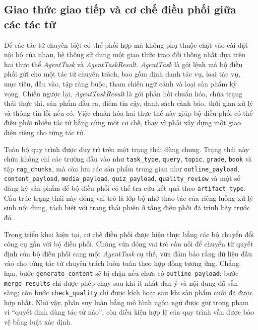 \documentclass[../DoAn.tex]{subfiles}
\begin{document}
\subsection{Giao thức giao tiếp và cơ chế điều phối giữa các tác tử}

Để các tác tử chuyên biệt có thể phối hợp mà không phụ thuộc chặt vào cài đặt nội bộ của nhau, hệ thống sử dụng một giao thức trao đổi thống nhất dựa trên hai thực thể \textit{AgentTask} và \textit{AgentTaskResult}. \textit{AgentTask} là gói lệnh mà bộ điều phối gửi cho một tác tử chuyên trách, bao gồm định danh tác vụ, loại tác vụ, mục tiêu, đầu vào, tập ràng buộc, tham chiếu ngữ cảnh và loại sản phẩm kỳ vọng. Chiều ngược lại, \textit{AgentTaskResult} là gói phản hồi chuẩn hóa, chứa trạng thái thực thi, sản phẩm đầu ra, điểm tin cậy, danh sách cảnh báo, thời gian xử lý và thông tin lỗi nếu có. Việc chuẩn hóa hai thực thể này giúp bộ điều phối có thể điều phối nhiều tác tử bằng cùng một cơ chế, thay vì phải xây dựng một giao diện riêng cho từng tác tử.

Toàn bộ quy trình được duy trì trên một trạng thái dùng chung. Trạng thái này chứa không chỉ các trường đầu vào như \texttt{task\_type}, \texttt{query}, \texttt{topic}, \texttt{grade}, \texttt{book} và tập \texttt{rag\_chunks}, mà còn lưu các sản phẩm trung gian như \texttt{outline\_payload}, \texttt{content\_payload}, \texttt{media\_payload}, \texttt{quiz\_payload}, \texttt{quality\_review} và một sổ đăng ký sản phẩm để bộ điều phối có thể tra cứu kết quả theo \texttt{artifact\_type}. Cấu trúc trạng thái này đóng vai trò là lớp bộ nhớ thao tác của riêng luồng xử lý sinh nội dung, tách biệt với trạng thái phiên ở tầng điều phối đã trình bày trước đó.

Trong triển khai hiện tại, cơ chế điều phối được hiện thực bằng các bộ chuyển đổi công cụ gắn với bộ điều phối. Chúng vừa đóng vai trò cầu nối để chuyển từ quyết định của bộ điều phối sang một \textit{AgentTask} cụ thể, vừa đảm bảo rằng dữ liệu đầu vào cho từng tác tử chuyên trách luôn tuân theo hợp đồng tương ứng. Chẳng hạn, bước \texttt{generate\_content} sẽ bị chặn nếu chưa có \texttt{outline\_payload}; bước \texttt{merge\_results} chỉ được phép chạy sau khi ít nhất dàn ý và nội dung đã sẵn sàng; còn bước \texttt{check\_quality} chỉ được kích hoạt sau khi sản phẩm cuối đã được hợp nhất. Nhờ vậy, phần suy luận bằng mô hình ngôn ngữ được giữ trong phạm vi ``quyết định dùng tác tử nào'', còn điều kiện hợp lệ của quy trình vẫn được bảo vệ bằng luật xác định.
\end{document}
